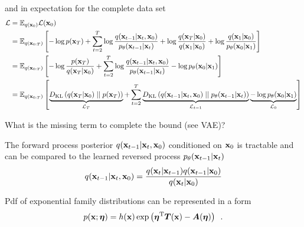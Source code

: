and in expectation for the complete data set
\begin{align}\label{eq:VarBoundLoss}
    \mathcal{L} &= \mathbb{E}_{q({\mathbf{x}}_0)} \mathcal{L}({\mathbf{x}}_0) \nonumber \\
    &= \mathbb{E}_{q({\mathbf{x}}_{0:T})} \left[ - \log p({\mathbf{x}}_T) + \sum_{t=2}^T \log \frac{q({\mathbf{x}}_{t-1} | {\mathbf{x}}_t, {\mathbf{x}}_0)}{p_{\theta}({\mathbf{x}}_{t-1} | {\mathbf{x}}_t) } + \log \frac{q({\mathbf{x}}_T | {\mathbf{x}}_0)}{q({\mathbf{x}}_1 | {\mathbf{x}}_0)} + \log \frac{q({\mathbf{x}}_1 | {\mathbf{x}}_0)}{p_{\theta}({\mathbf{x}}_0 | {\mathbf{x}}_1) } \right] \nonumber \\
    &= \mathbb{E}_{q({\mathbf{x}}_{0:T})} \left[ - \log \frac{p({\mathbf{x}}_T)}{q({\mathbf{x}}_T | {\mathbf{x}}_0)} + \sum_{t=2}^T \log \frac{q({\mathbf{x}}_{t-1} | {\mathbf{x}}_t, {\mathbf{x}}_0)}{p_{\theta}({\mathbf{x}}_{t-1} | {\mathbf{x}}_t) } - \log p_{\theta}({\mathbf{x}}_0 | {\mathbf{x}}_1)  \right] \nonumber \\
    &= \mathbb{E}_{q({\mathbf{x}}_{0:T})} \left[ \underbrace{D_{\mathrm{KL}}\left(q({\mathbf{x}}_T | {\mathbf{x}}_0) \mid\mid p({\mathbf{x}}_T)\right)}_{\mathcal{L}_T} +
    \sum_{t=2}^T \underbrace{D_{\mathrm{KL}}\left( q({\mathbf{x}}_{t-1} | {\mathbf{x}}_t, {\mathbf{x}}_0) \mid\mid p_{\theta}({\mathbf{x}}_{t-1} | {\mathbf{x}}_t) \right)}_{\mathcal{L}_{t-1}}
    \underbrace{- \log p_{\theta}({\mathbf{x}}_0 | {\mathbf{x}}_1)}_{\mathcal{L}_0}
     \right]
\end{align} 

\begin{notebox}[colback=red!5]
What is the missing term to complete the bound (see VAE)?
\end{notebox}

The forward process posterior $q({\mathbf{x}}_{t-1} | {\mathbf{x}}_t, {\mathbf{x}}_0)$ conditioned on ${\mathbf{x}}_0$ is tractable and can be compared to the learned reversed process $p_{\theta}({\mathbf{x}}_{t-1} | {\mathbf{x}}_t)$
\begin{equation}
    q({\mathbf{x}}_{t-1} | {\mathbf{x}}_t, {\mathbf{x}}_0) = \frac{q({\mathbf{x}}_t | {\mathbf{x}}_{t-1}) q({\mathbf{x}}_{t-1} | {\mathbf{x}}_0) }{q({\mathbf{x}}_t | {\mathbf{x}}_0) }
\end{equation}

Pdf of exponential family distributions can be represented in a form
\begin{equation}
    p({\mathbf{x}}; \bm{\eta}) = h({\mathbf{x}}) \exp \left( \bm{\eta}^{\mathrm{T}} {\bm{T}}({\mathbf{x}}) - {\bm{A}}(\bm{\eta}) \right) \enspace .
\end{equation}


